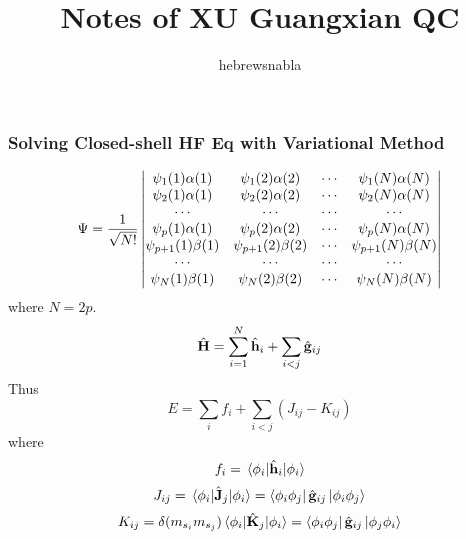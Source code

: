 \documentclass[UTF8]{ctexart} %
\title{Notes of XU Guangxian QC}
\author{hebrewsnabla}
\numberwithin{equation}{section}
\begin{document}
\maketitle

\setcounter{section}{11}
\section{}
\subsection{}
\setcounter{subsubsection}{1}
\subsubsection{Solving Closed-shell HF Eq with Variational Method}
\begin{equation}\label{key}
\Psi=\dfrac{1}{\sqrt{N!}}
\mdet{\psi_1(1)\alpha(1) & \psi_1(2)\alpha(2) &\cdots &\psi_1(N)\alpha(N)\\
\psi_2(1)\alpha(1) & \psi_2(2)\alpha(2) &\cdots &\psi_2(N)\alpha(N)\\
\cdots&\cdots&\cdots&\cdots\\
\psi_p(1)\alpha(1) & \psi_p(2)\alpha(2) &\cdots &\psi_p(N)\alpha(N)\\
\psi_{p+1}(1)\beta(1) & \psi_{p+1}(2)\beta(2) &\cdots &\psi_{p+1}(N)\beta(N)\\
\cdots&\cdots&\cdots&\cdots\\
\psi_N(1)\beta(1) & \psi_N(2)\beta(2) &\cdots &\psi_N(N)\beta(N)}
\end{equation}
where $N=2p$.\\
\begin{equation}\label{key}
\hat{\vb{H}}=\sum_{i=1}^N \hat{\vb{h}}_i+\sum_{i<j}\hat{\vb{g}}_{ij}
\end{equation}
Thus
\begin{equation}\label{key}
E=\sum_i f_i + \sum_{i<j}(J_{ij}-K_{ij})
\end{equation}
where
\begin{equation}
f_i=\ev{\hat{\vb{h}}_i}{\phi_i}
\end{equation}
\begin{equation}\label{key}
J_{ij}=\ev{\hat{\vb{J}}_{j}}{\phi_i}=\bra{\phi_i \phi_j}\hat{\vb{g}}_{ij}\ket{\phi_i \phi_j}
\end{equation}
\begin{equation}\label{key}
K_{ij}=\delta(m_{s_i}m_{s_j})\ev{\hat{\vb{K}}_{j}}{\phi_i}=\bra{\phi_i \phi_j}\hat{\vb{g}}_{ij}\ket{\phi_j \phi_i}
\end{equation}
\end{document}
